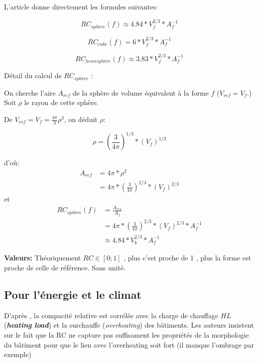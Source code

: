 \documentclass[[a4paper, 11pt]{article}
\begin{document}
L'article  \cite{pessenlehner_building_2003} donne directement les formules suivantes:


\begin{equation}
RC_{sphère}(f) \approx 4.84 * V_f^{2/3} * A_f^{-1}
\end{equation}


\begin{equation}
RC_{cube}(f) =6 * V_f^{2/3} * A_f^{-1}
\end{equation}


\begin{equation}
RC_{hemisphère}(f) \approx 3.83 * V_f^{2/3} * A_f^{-1}
\end{equation}


Détail du calcul de $RC_{sphère}$ :

On cherche l'aire $A_{ref}$ de la sphère de volume équivalent à la forme $f$ ($V_{ref}=V_f$.)
Soit $\rho$ le rayon de cette sphère. 

De $V_{ref}=V_f=\frac{4\pi}{3}\rho^3 $, on déduit $\rho$:

\begin{equation*}
\rho = \left (\frac{3}{4\pi}\right)^{1/3} *(V_f)^{1/3}
\end{equation*}


d'où:
\begin{align*}
A_{ref} &= 4\pi * \rho^2\\
 &= 4\pi*\left( \frac{3}{4\pi}\right)^{2/3}*(V_f)^{2/3}
\end{align*}
et 
\begin{align*}
RC_{sphère}(f)&= \frac{A_{ref}}{A_f}\\
       &=4\pi*\left( \frac{3}{4\pi}\right)^{2/3}*(V_f)^{2/3} * A_f^{-1}\\
       &\approx 4.84 * V_b^{2/3} * A_f^{-1} 
\end{align*}


\textbf{Valeurs:} Théoriquement $RC\in[0;1]$ , plus c'est proche de 1 , plus la forme est proche de celle de référence. Sans unité.





\subsection{Pour l'énergie et le climat} %
\label{sub:pour_l_énergie_et_le_climat}

D'après \cite{pessenlehner_building_2003}, la compacité relative est corrélée avec la charge de chauffage $HL$ (\textbf{\textit{heating load}}) et la surchauffe (\textit{overheating}) des bâtiments.
Les auteurs insistent sur le fait que la RC ne capture pas suffisament les propriétés de la morphologie du bâtiment  pour que le lien avec l'overheating soit fort (il manque l'ombrage par exemple)
\end{document}
